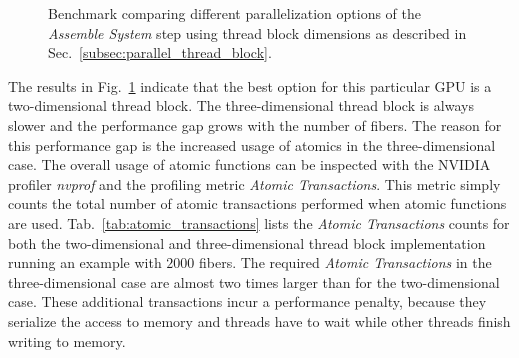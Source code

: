 \begin{figure}[!htbp]
  \centering
  \caption[Benchmarking thread block dimensions.]{Benchmark comparing different parallelization options of the \emph{Assemble System} step using thread block dimensions as described in Sec.~\ref{subsec:parallel_thread_block}. }
  \label{fig:bench_cuda_thread_blocks}
\end{figure}

The results in Fig.~\ref{fig:bench_cuda_thread_blocks} indicate that the best option for this particular GPU is a two-dimensional thread block. The three-dimensional thread block is always slower and the performance gap grows with the number of fibers. The reason for this performance gap is the increased usage of atomics in the three-dimensional case. The overall usage of atomic functions can be inspected with the NVIDIA profiler \emph{nvprof} and the profiling metric \emph{Atomic Transactions}. This metric simply counts the total number of atomic transactions performed when atomic functions are used. Tab.~\ref{tab:atomic_transactions} lists the \emph{Atomic Transactions} counts for both the two-dimensional and three-dimensional thread block implementation running an example with $2000$ fibers. The required \emph{Atomic Transactions} in the three-dimensional case are almost two times larger than for the two-dimensional case. These additional transactions incur a performance penalty, because they serialize the access to memory and threads have to wait while other threads finish writing to memory.

